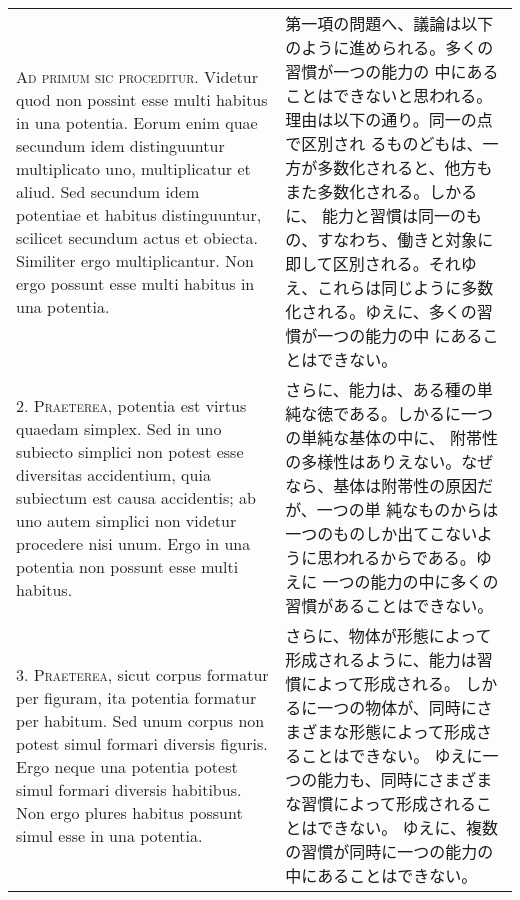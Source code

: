 \documentclass[10pt]{jsarticle} %
\begin{document}
\begin{longtable}{p{21em}p{21em}}

{\scshape Ad primum sic proceditur}. Videtur quod non possint esse
multi habitus in una potentia. Eorum enim quae secundum idem
distinguuntur multiplicato uno, multiplicatur et aliud. Sed secundum
idem potentiae et habitus distinguuntur, scilicet secundum actus et
obiecta. Similiter ergo multiplicantur. Non ergo possunt esse multi
habitus in una potentia.

&

第一項の問題へ、議論は以下のように進められる。多くの習慣が一つの能力の
中にあることはできないと思われる。理由は以下の通り。同一の点で区別され
るものどもは、一方が多数化されると、他方もまた多数化される。しかるに、
能力と習慣は同一のもの、すなわち、働きと対象に即して区別される。それゆ
え、これらは同じように多数化される。ゆえに、多くの習慣が一つの能力の中
にあることはできない。

\\




2. {\scshape Praeterea}, potentia est virtus quaedam simplex. Sed in
uno subiecto simplici non potest esse diversitas accidentium, quia
subiectum est causa accidentis; ab uno autem simplici non videtur
procedere nisi unum. Ergo in una potentia non possunt esse multi
habitus.

&

さらに、能力は、ある種の単純な徳である。しかるに一つの単純な基体の中に、
附帯性の多様性はありえない。なぜなら、基体は附帯性の原因だが、一つの単
純なものからは一つのものしか出てこないように思われるからである。ゆえに
一つの能力の中に多くの習慣があることはできない。

\\




3. {\scshape Praeterea}, sicut corpus formatur per figuram, ita
potentia formatur per habitum. Sed unum corpus non potest simul
formari diversis figuris. Ergo neque una potentia potest simul formari
diversis habitibus. Non ergo plures habitus possunt simul esse in una
potentia.

&

さらに、物体が形態によって形成されるように、能力は習慣によって形成される。
しかるに一つの物体が、同時にさまざまな形態によって形成さることはできない。
ゆえに一つの能力も、同時にさまざまな習慣によって形成されることはできない。
ゆえに、複数の習慣が同時に一つの能力の中にあることはできない。

\\





\end{longtable}
\end{document}
